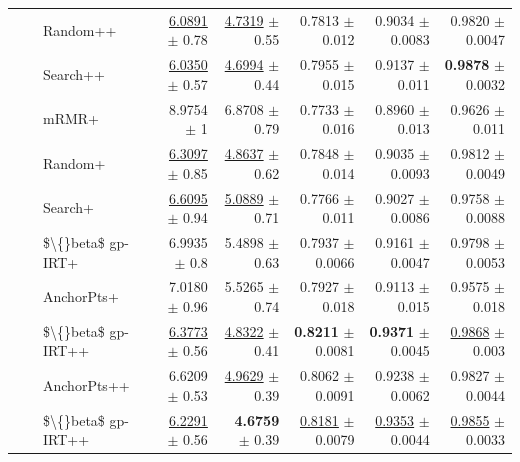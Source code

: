\begin{longtable}{llp{}rrrrr}
 &  & Random++ & \underline{6.0891} {\scriptsize $\pm$ 0.78} & \underline{4.7319} {\scriptsize $\pm$ 0.55} & 0.7813 {\scriptsize $\pm$ 0.012} & 0.9034 {\scriptsize $\pm$ 0.0083} & 0.9820 {\scriptsize $\pm$ 0.0047} \\
 &  & Search++ & \underline{6.0350} {\scriptsize $\pm$ 0.57} & \underline{4.6994} {\scriptsize $\pm$ 0.44} & 0.7955 {\scriptsize $\pm$ 0.015} & 0.9137 {\scriptsize $\pm$ 0.011} & \textbf{0.9878} {\scriptsize $\pm$ 0.0032} \\
 &  & mRMR+ & 8.9754 {\scriptsize $\pm$ 1} & 6.8708 {\scriptsize $\pm$ 0.79} & 0.7733 {\scriptsize $\pm$ 0.016} & 0.8960 {\scriptsize $\pm$ 0.013} & 0.9626 {\scriptsize $\pm$ 0.011} \\
 &  & Random+ & \underline{6.3097} {\scriptsize $\pm$ 0.85} & \underline{4.8637} {\scriptsize $\pm$ 0.62} & 0.7848 {\scriptsize $\pm$ 0.014} & 0.9035 {\scriptsize $\pm$ 0.0093} & 0.9812 {\scriptsize $\pm$ 0.0049} \\
 &  & Search+ & \underline{6.6095} {\scriptsize $\pm$ 0.94} & \underline{5.0889} {\scriptsize $\pm$ 0.71} & 0.7766 {\scriptsize $\pm$ 0.011} & 0.9027 {\scriptsize $\pm$ 0.0086} & 0.9758 {\scriptsize $\pm$ 0.0088} \\
 &  & \$\textbackslash\{\}beta\$ gp-IRT+ & 6.9935 {\scriptsize $\pm$ 0.8} & 5.4898 {\scriptsize $\pm$ 0.63} & 0.7937 {\scriptsize $\pm$ 0.0066} & 0.9161 {\scriptsize $\pm$ 0.0047} & 0.9798 {\scriptsize $\pm$ 0.0053} \\
 &  & AnchorPts+ & 7.0180 {\scriptsize $\pm$ 0.96} & 5.5265 {\scriptsize $\pm$ 0.74} & 0.7927 {\scriptsize $\pm$ 0.018} & 0.9113 {\scriptsize $\pm$ 0.015} & 0.9575 {\scriptsize $\pm$ 0.018} \\
 &  & \$\textbackslash\{\}beta\$ gp-IRT++ & \underline{6.3773} {\scriptsize $\pm$ 0.56} & \underline{4.8322} {\scriptsize $\pm$ 0.41} & \textbf{0.8211} {\scriptsize $\pm$ 0.0081} & \textbf{0.9371} {\scriptsize $\pm$ 0.0045} & \underline{0.9868} {\scriptsize $\pm$ 0.003} \\
 &  & AnchorPts++ & 6.6209 {\scriptsize $\pm$ 0.53} & \underline{4.9629} {\scriptsize $\pm$ 0.39} & 0.8062 {\scriptsize $\pm$ 0.0091} & 0.9238 {\scriptsize $\pm$ 0.0062} & 0.9827 {\scriptsize $\pm$ 0.0044} \\
 &  & \$\textbackslash\{\}beta\$ gp-IRT++ & \underline{6.2291} {\scriptsize $\pm$ 0.56} & \textbf{4.6759} {\scriptsize $\pm$ 0.39} & \underline{0.8181} {\scriptsize $\pm$ 0.0079} & \underline{0.9353} {\scriptsize $\pm$ 0.0044} & \underline{0.9855} {\scriptsize $\pm$ 0.0033} \\

\end{longtable}
